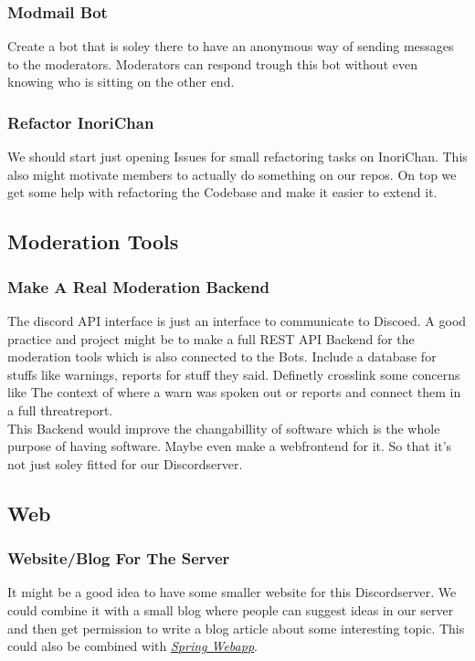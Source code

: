 \documentclass{article}
\newcommand{\refsection}[2]{\hyperref[#1]{\underline{\textit{#2}}}}
\begin{document}
    \subsubsection{Modmail Bot}
    \label{sec:modmailbot}
    Create a bot that is soley there to have an anonymous way of sending messages to the moderators. 
    Moderators can respond trough this bot without even knowing who is sitting on the other end.

    \subsubsection{Refactor InoriChan}
    We should start just opening Issues for small refactoring tasks on InoriChan. 
    This also might motivate members to actually do something on our repos. 
    On top we get some help with refactoring the Codebase and make it easier to extend it.

    \subsection{Moderation Tools}

    \subsubsection{Make A Real Moderation Backend}
    The discord API interface is just an interface to communicate to Discoed. 
    A good practice and project might be to make a full REST API Backend for the moderation tools which is also connected to the Bots. 
    Include a database for stuffs like warnings, reports for stuff they said. 
    Definetly crosslink some concerns like The context of where a warn was spoken out or reports and connect them in a full threatreport. \\
    This Backend would improve the changabillity of software which is the whole purpose of having software. 
    Maybe even make a webfrontend for it. So that it's not just soley fitted for our Discordserver.

    \subsection{Web}

    \subsubsection{Website/Blog For The Server}
    It might be a good idea to have some smaller website for this Discordserver. 
    We could combine it with a small blog where people can suggest ideas in our server and then get permission to write a blog article about some interesting topic.
    This could also be combined with \refsection{sec:springwebapp}{Spring Webapp}.
\end{document}
